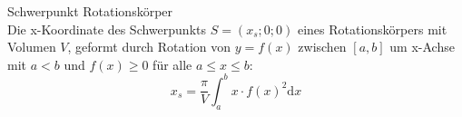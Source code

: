 \begin{theorem}{Schwerpunkt Rotationskörper}\\
    Die x-Koordinate des Schwerpunkts \(S=(x_s;0;0) \) eines Rotationskörpers mit Volumen \(V\), geformt durch Rotation
    von \(y=f(x)\) zwischen \([a,b]\) um x-Achse mit \(a<b\) und \(f(x) \ge 0 \) für alle \(a \le x \le b \):
    \[x_s = \frac{\pi}{V}\int_a^b{x\cdot f(x)^2\mathrm{d}x} \]
\end{theorem}


